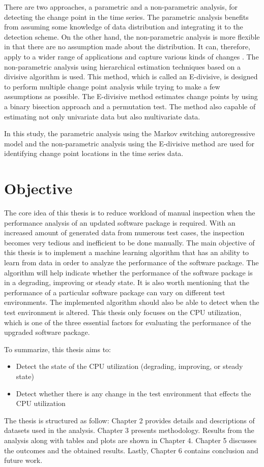 There are two approaches, a parametric and a non-parametric analysis,
for detecting the change point in the time series. The parametric
analysis benefits from assuming some knowledge of data distribution
and integrating it to the detection scheme. On the other hand, the
non-parametric analysis is more flexible in that there are no assumption
made about the distribution. It can, therefore, apply to a wider range
of applications and capture various kinds of changes \citep{sharkey2014nonparametric}.
The non-parametric analysis using hierarchical estimation techniques
based on a divisive algorithm is used. This method, which is called
an E-divisive, is designed to perform multiple change point analysis
while trying to make a few assumptions as possible. The E-divisive
method estimates change points by using a binary bisection approach
and a permutation test. The method also capable of estimating not
only univariate data but also multivariate data. 

In this study, the parametric analysis using the Markov switching
autoregressive model and the non-parametric analysis using the E-divisive
method are used for identifying change point locations in the time
series data. 

\section{Objective \label{sec:Objective}}

The core idea of this thesis is to reduce workload of manual inspection
when the performance analysis of an updated software package is required.
With an increased amount of generated data from numerous test cases,
the inspection becomes very tedious and inefficient to be done manually.
The main objective of this thesis is to implement a machine learning
algorithm that has an ability to learn from data in order to analyze
the performance of the software package. The algorithm will help indicate
whether the performance of the software package is in a degrading,
improving or steady state. It is also worth mentioning that the performance
of a particular software package can vary on different test environments.
The implemented algorithm should also be able to detect when the test
environment is altered. This thesis only focuses on the CPU utilization,
which is one of the three essential factors for evaluating the performance
of the upgraded software package.

To summarize, this thesis aims to:
\begin{itemize}
\item Detect the state of the CPU utilization (degrading, improving, or
steady state)
\item Detect whether there is any change in the test environment that effects
the CPU utilization
\end{itemize}
The thesis is structured as follow: Chapter 2 provides details and
descriptions of datasets used in the analysis. Chapter 3 presents
methodology. Results from the analysis along with tables and plots
are shown in Chapter 4. Chapter 5 discusses the outcomes and the obtained
results. Lastly, Chapter 6 contains conclusion and future work.



